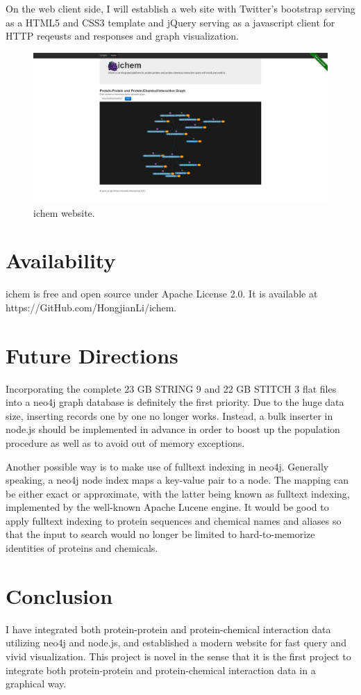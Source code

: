 \documentclass[10pt,conference,compsocconf]{../IEEEtran}
\begin{document}
On the web client side, I will establish a web site with Twitter's bootstrap serving as a HTML5 and CSS3 template and jQuery serving as a javascript client for HTTP reqeusts and responses and graph visualization.

\begin{figure}
\centering
\includegraphics[width=\linewidth]{ichem.png}
\caption{ichem website.}
\label{fig:ichem}
\end{figure}

\section{Availability}

ichem is free and open source under Apache License 2.0. It is available at https://GitHub.com/HongjianLi/ichem.

\section{Future Directions}

Incorporating the complete 23 GB STRING 9 and 22 GB STITCH 3 flat files into a neo4j graph database is definitely the first priority. Due to the huge data size, inserting records one by one no longer works. Instead, a bulk inserter in node.js should be implemented in advance in order to boost up the population procedure as well as to avoid out of memory exceptions.

Another possible way is to make use of fulltext indexing in neo4j. Generally speaking, a neo4j node index maps a key-value pair to a node. The mapping can be either exact or approximate, with the latter being known as fulltext indexing, implemented by the well-known Apache Lucene engine. It would be good to apply fulltext indexing to protein sequences and chemical names and aliases so that the input to search would no longer be limited to hard-to-memorize identities of proteins and chemicals.

\section{Conclusion}

I have integrated both protein-protein and protein-chemical interaction data utilizing neo4j and node.js, and established a modern website for fast query and vivid visualization. This project is novel in the sense that it is the first project to integrate both protein-protein and protein-chemical interaction data in a graphical way.



\end{document}

